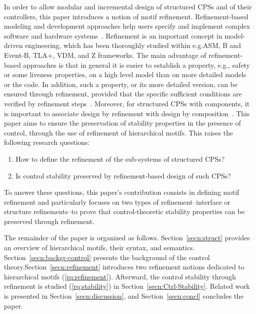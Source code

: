 \documentclass[runningheads]{llncs}
\makeatletter
\newenvironment{rqs}{\begin{enumerate}[label=\textbf{RQ\arabic*}]}{\end{enumerate}}
\newcommand{\eg}[1][\@ ]{e.g.{#1}}
\makeatother
\begin{document}
\smallskip

In order to allow modular and incremental design of structured CPSs and of their controllers, this paper introduces a notion of motif refinement. Refinement-based modeling and development approaches help users specify and implement complex software and hardware systems~\cite{LecomteDPM17,DupontASP21}. 
Refinement is an important concept in model-driven engineering, which has been thoroughly studied within \eg ASM, B and Event-B, TLA+, VDM, and Z frameworks. The main advantage of refinement-based approaches is that in general it is easier to establish a property, \eg[], safety or some liveness properties, on a high level model than on more detailed models or the code. 
In addition, such a property, or its more detailed version, can be ensured through refinement, provided that the specific sufficient conditions are verified by refinement steps~\cite{BellegardeDJK01,Hoang2016FoundationsFU}. 
Moreover, for structured CPSs with components, it is important to associate design by refinement with design by composition~\cite{CoullonHLR24}.
%
This paper aims to ensure the preservation of stability properties in the presence of control, through the use of refinement of hierarchical motifs. This raises the following research questions:
%
\begin{rqs}
\setcounter{enumi}{0}
\item\label{rq:refinement} How to define the refinement of the sub-systems of structured CPSs? 
\item\label{rq:stability} Is control stability preserved by refinement-based design of such CPSs?
\end{rqs}
%
To answer these questions, this paper's contribution consists in defining motif refinement and particularly focuses on two types of refinement--interface or structure refinements--to prove that control-theoretic stability properties can be preserved through refinement. 

The remainder of the paper is organized as follows. Section~\ref{secn:struct} provides an overview of hierarchical motifs, their syntax, and semantics.
Section~\ref{secn:backgr-control} presents the background of the control theory.Section~\ref{secn:refinement} introduces two refinement notions dedicated to hierarchical motifs (\ref{rq:refinement}). Afterward, the control stability through refinement is studied (\ref{rq:stability}) in Section~\ref{secn:Ctrl-Stability}. Related work is presented in Section~\ref{secn:discussion}, and Section~\ref{secn:concl} concludes the paper. 
\end{document}

